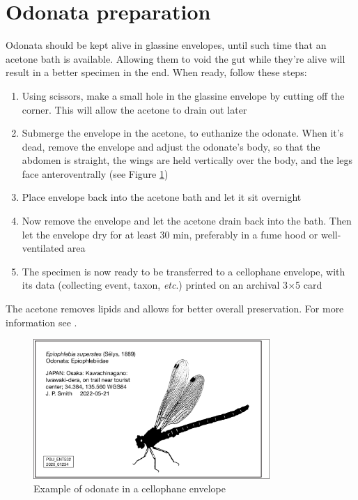 \section{Odonata preparation}\label{odeprep}
Odonata should be kept alive in glassine envelopes, until such time that an acetone bath is available. Allowing them to void the gut while they're alive will result in a better specimen in the end. When ready, follow these steps:
\begin{enumerate}
    \item Using scissors, make a small hole in the glassine envelope by cutting off the corner. This will allow the acetone to drain out later
    \item Submerge the envelope in the acetone, to euthanize the odonate. When it's dead, remove the envelope and adjust the odonate's body, so that the abdomen is straight, the wings are held vertically over the body, and the legs face anteroventrally (see Figure \ref{odeEnvelope})
    \item Place envelope back into the acetone bath and let it sit overnight
    \item Now remove the envelope and let the acetone drain back into the bath. Then let the envelope dry for at least 30 min, preferably in a fume hood or well-ventilated area
    \item The specimen is now ready to be transferred to a cellophane envelope, with its data (collecting event, taxon, \textit{etc}.) printed on an archival 3$\times$5 card
\end{enumerate}
The acetone removes lipids and allows for better overall preservation. For more information see \cite{Tennessen2019}. 

\begin{figure}[ht!]
	\centering
  \includegraphics[width=0.8\textwidth]{sections/img/specimenPreps/OdonataEnvelope.pdf}
  \caption{Example of odonate in a cellophane envelope}
  \label{odeEnvelope}
\end{figure}


